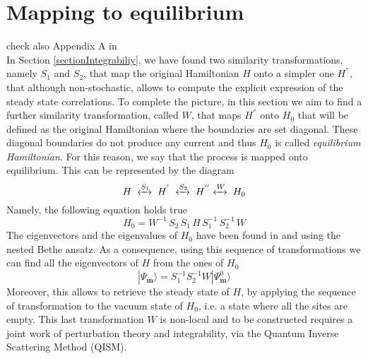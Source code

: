 \documentclass[10pt]{article}
\numberwithin{equation}{section}
\numberwithin{equation}{subsection}
\begin{document}
\section{Mapping to equilibrium} \label{Section-Mapping}
{\color{red}check also Appendix A in
\cite{Alcaraz:1992zc} \cite{Sklyanin:1988yz}} \\
In Section \ref{sectionIntegrabiliy}, we have found two similarity transformations, namely $S_{1}$ and $S_{2}$, that map the original Hamiltonian $H$ onto a simpler one $H^{''}$, that although non-stochastic, allows to compute the explicit expression of the steady state correlations. To complete the picture, in this section we aim to find a further similarity transformation, called $W$, that maps $H^{''}$ onto $H_{0}$ that will be defined as the original Hamiltonian where the boundaries are set diagonal. These diagonal boundaries do not produce any current and thus $H_{0}$ is called \textit{equilibrium Hamiltonian}. For this reason, we say that the process is mapped onto equilibrium.
This can be represented by the diagram 
\begin{equation}
	H\;\xleftrightarrow{S_{1}}\;H^{'}\;\xleftrightarrow{S_{2}}\;H^{''}\xleftrightarrow{W}\;H_{0}
\end{equation} 
Namely, the following equation holds true
\begin{equation}
	H_{0}=W^{-1}\,S_{2}\,S_{1}\,H\,S_{1}^{-1}\,S_{2}^{-1}\,W
\end{equation}
The eigenvectors and the eigenvalues of $H_{0}$ have been found in \cite{belliard2} and \cite{belliard2011nested} using the nested Bethe ansatz. 
As a consequence, using this sequence of transformations we can find all the eigenvectors of $H$ from the ones of $H_{0}$
\begin{equation}
	|\Psi_{\bm{m}}\rangle=S_{1}^{-1}S_{2}^{-1}W|\Psi_{\bm{m}}^{0}\rangle
\end{equation}
Moreover, this allows to retrieve the steady state of $H$, by applying the sequence of transformation to the vacuum state of $H_{0}$, i.e. a state where all the sites are empty. This last transformation $W$ is non-local and to be constructed requires a joint work of perturbation theory and integrability, via the Quantum Inverse Scattering Method (QISM). 
\end{document}

